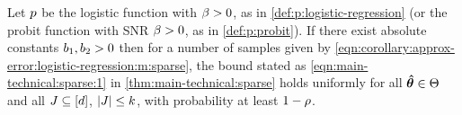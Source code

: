 \begin{corollary}
\label{corollary:main-technical:logistic-regression}
%
Let \(  p  \) be the logistic function with \betaXnamelr \(  \beta > 0  \), as in \DEFINITION \ref{def:p:logistic-regression} (or the probit function with SNR \(  \beta > 0  \), as in \DEFINITION \ref{def:p:probit}).
If there exist absolute constants \(  b_{1}, b_{2} > 0  \) then for a number of samples given by
 \EQUATION \eqref{eqn:corollary:approx-error:logistic-regression:m:sparse},
 the bound stated as \EQUATION \eqref{eqn:main-technical:sparse:1} in \THEOREM \ref{thm:main-technical:sparse} holds uniformly for all \(  \thetaXX \in \ParamSpace  \) and all \(  J \subseteq [d]  \), \(  | J | \leq k  \), with probability at least \(  1-\rho  \).
\end{corollary}

